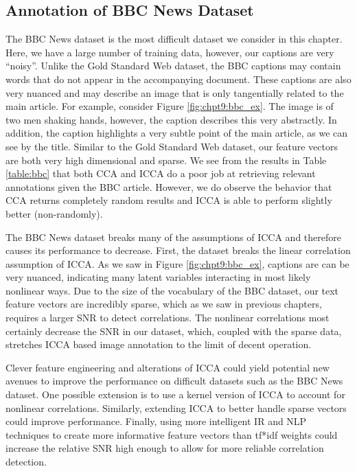 \subsection{Annotation of BBC News Dataset}

The BBC News dataset is the most difficult dataset we consider in this chapter. Here, we
have a large number of training data, however, our captions are very ``noisy''. Unlike the
Gold Standard Web dataset, the BBC captions may contain words that do not appear in the
accompanying document. These captions are also very nuanced and may describe an image that
is only tangentially related to the main article. For example, consider Figure
\ref{fig:chpt9:bbc_ex}. The image is of two men shaking hands, however, the caption
describes this very abstractly. In addition, the caption highlights a very subtle point of
the main article, as we can see by the title. Similar to the Gold Standard Web dataset,
our feature vectors are both very high dimensional and sparse. We see from the results in
Table \ref{table:bbc} that both CCA and ICCA do a poor job at retrieving relevant
annotations given the BBC article. However, we do observe the behavior that CCA returns
completely random results and ICCA is able to perform slightly better (non-randomly).

The BBC News dataset breaks many of the assumptions of ICCA and therefore causes its
performance to decrease. First, the dataset breaks the linear correlation assumption of
ICCA. As we saw in Figure \ref{fig:chpt9:bbc_ex}, captions are can be very nuanced, indicating
many latent variables interacting in most likely nonlinear ways. Due to the size of the
vocabulary of the BBC dataset, our text feature vectors are incredibly sparse, which as we
saw in previous chapters, requires a larger SNR to detect correlations. The nonlinear
correlations most certainly decrease the SNR in our dataset, which, coupled with the
sparse data, stretches ICCA based image annotation to the limit of decent operation. 

Clever feature engineering and alterations of ICCA could yield potential new avenues to
improve the performance on difficult datasets such as the BBC News dataset. One possible
extension is to use a kernel version of ICCA to account for nonlinear
correlations. Similarly, extending ICCA to better handle sparse vectors could improve
performance. Finally, using more intelligent IR and NLP techniques to create more
informative feature vectors than tf*idf weights could increase the relative SNR high
enough to allow for more reliable correlation detection.

